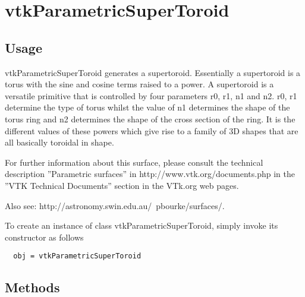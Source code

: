 \section{vtkParametricSuperToroid}

\subsection{Usage}

 vtkParametricSuperToroid generates a supertoroid.  Essentially a
 supertoroid is a torus with the sine and cosine terms raised to a power.
 A supertoroid is a versatile primitive that is controlled by four
 parameters r0, r1, n1 and n2. r0, r1 determine the type of torus whilst
 the value of n1 determines the shape of the torus ring and n2 determines
 the shape of the cross section of the ring. It is the different values of
 these powers which give rise to a family of 3D shapes that are all
 basically toroidal in shape.

 For further information about this surface, please consult the 
 technical description ''Parametric surfaces'' in http://www.vtk.org/documents.php 
 in the ''VTK Technical Documents'' section in the VTk.org web pages.

 Also see: http://astronomy.swin.edu.au/~pbourke/surfaces/.


To create an instance of class vtkParametricSuperToroid, simply
invoke its constructor as follows
\begin{verbatim}
  obj = vtkParametricSuperToroid
\end{verbatim}
\subsection{Methods}

